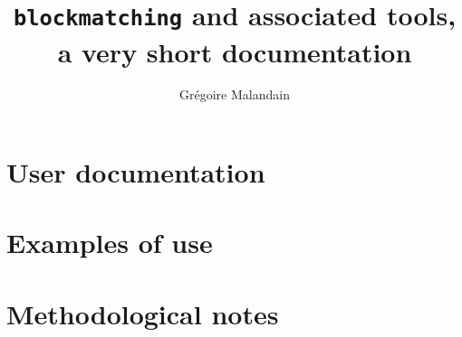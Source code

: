 \documentclass[10pt]{report}
\begin{document}
\title{\texttt{blockmatching} and associated tools, a very short documentation}
\author{Gr\'egoire Malandain}
\maketitle

\tableofcontents



\part{User documentation}

 

 

\part{Examples of use}



\part{Methodological notes}







% 


% 


% 





\printindex
\end{document}
